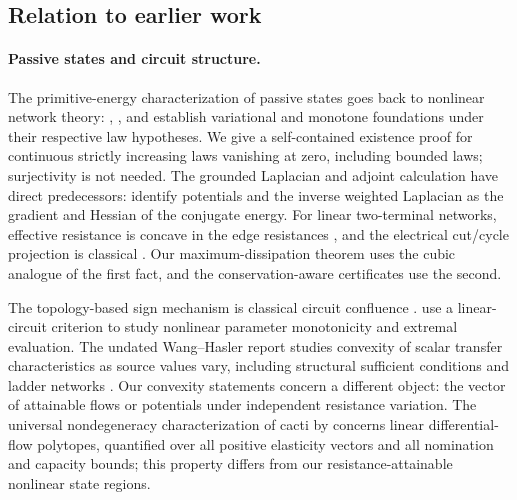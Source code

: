 \subsection{Relation to earlier work}
\label{subsec:main-literature}

\paragraph{Passive states and circuit structure.}
The primitive-energy characterization of passive states goes back to
nonlinear network theory: \citet{duffin1947-nonlinear-networks-iia},
\citet{birkhoff1956-non-linear-network-problems}, and
\citet{minty1960-monotone-networks} establish variational and monotone
foundations under their respective law hypotheses. We give a
self-contained existence proof for continuous strictly increasing laws
vanishing at zero, including bounded laws; surjectivity is not needed.
The grounded Laplacian and adjoint calculation have direct predecessors:
\citet[Section IV-A]{misra2015-maximum-throughput-problem-in-dissipative}
identify potentials and the inverse weighted Laplacian as the gradient
and Hessian of the conjugate energy. For linear two-terminal networks,
effective resistance is concave in the edge resistances
\citep{shannon1956-concavity}, and the electrical cut/cycle projection is
classical \citep[Chapter 2, Section 4]{lyons2016-probability}. Our
maximum-dissipation theorem uses the cubic analogue of the first fact,
and the conservation-aware certificates use the second.

The topology-based sign mechanism is classical circuit confluence
\citep{duffin1965-topology-of-series-parallel-networks}.
\citet[Theorem 3 and conclusion]{chauffoureaux1990-monotonicity}
use a linear-circuit criterion to study nonlinear parameter monotonicity
and extremal evaluation. The undated Wang--Hasler report studies
convexity of scalar transfer characteristics as source values vary,
including structural sufficient conditions and ladder networks
\citep[Theorems 1, 4, and 5]{wanghasler1997-convexity}. Our convexity
statements concern a different object: the vector of attainable flows
or potentials under independent resistance variation. The universal
nondegeneracy characterization of cacti by
\citet{brandenberg2025-differential} concerns linear differential-flow
polytopes, quantified over all positive elasticity vectors and all
nomination and capacity bounds; this property differs from our
resistance-attainable nonlinear state regions.

